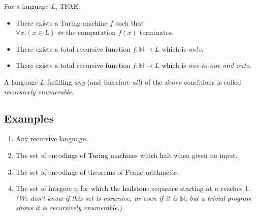 \documentclass[12pt]{article}
\newcommand{\Nats}{\mathbb{N}}
\begin{document}
For a language $L$, TFAE:
\begin{itemize}

\item There exists a Turing machine $f$ such that $\forall x.(x\in L) \iff \mbox{the computation $f(x)$ terminates}$.

\item There exists a total recursive function $f:\Nats\to L$ which is \emph{onto}.

\item There exists a total recursive function $f:\Nats\to L$ which is \emph{one-to-one and onto}.

\end{itemize}

A language $L$ fulfilling \emph{any} (and therefore \emph{all}) of the above conditions is called \emph{recursively enumerable}.

\subsection*{Examples}

\begin{enumerate}
\item Any recursive language.
\item The set of encodings of Turing machines which halt when given no input.
\item The set of encodings of theorems of Peano arithmetic.
\item The set of integers $n$ for which the hailstone sequence starting at $n$ reaches 1.  \textit{(We don't know if this set is recursive, or even if it is $\Nats$; but a trivial program shows it is recursively enumerable.)}
\end{enumerate}
\end{document}
